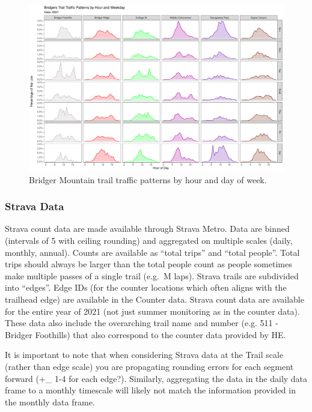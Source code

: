 \documentclass[
]{book}
\begin{document}
\begin{figure}

{\centering \includegraphics[width=1\linewidth]{../figures/hourly_bydayofweek_lowuse} 

}

\caption{Bridger Mountain trail traffic patterns by hour and day of week.}\label{fig:hourly-low}
\end{figure}

\hypertarget{strava-data}{%
\subsubsection{Strava Data}\label{strava-data}}

Strava count data are made available through Strava Metro. Data are
binned (intervals of 5 with ceiling rounding) and aggregated on multiple
scales (daily, monthly, annual). Counts are available as ``total trips''
and ``total people''. Total trips should always be larger than the total
people count as people sometimes make multiple passes of a single trail
(e.g.~M laps). Strava trails are subdivided into ``edges''. Edge IDs (for
the counter locations which often aligns with the trailhead edge) are
available in the Counter data. Strava count data are available for the
entire year of 2021 (not just summer monitoring as in the counter data).
These data also include the overarching trail name and number (e.g.
511 - Bridger Foothills) that also correspond to the counter data
provided by HE.

It is important to note that when considering Strava data at the Trail
scale (rather than edge scale) you are propagating rounding errors for
each segment forward (+\_ 1-4 for each edge?). Similarly, aggregating
the data in the daily data frame to a monthly timescale will likely not
match the information provided in the monthly data frame.
\end{document}
